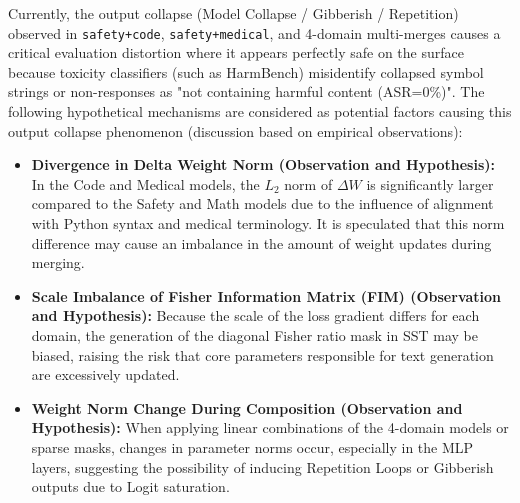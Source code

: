 \documentclass{article}
\begin{document}

Currently, the output collapse (Model Collapse / Gibberish / Repetition) observed in \texttt{safety+code}, \texttt{safety+medical}, and 4-domain multi-merges causes a critical evaluation distortion where it appears perfectly safe on the surface because toxicity classifiers (such as HarmBench) misidentify collapsed symbol strings or non-responses as "not containing harmful content (ASR=0\%)".
The following hypothetical mechanisms are considered as potential factors causing this output collapse phenomenon (discussion based on empirical observations):
\begin{itemize}
    \item \textbf{Divergence in Delta Weight Norm (Observation and Hypothesis):}
    In the Code and Medical models, the $L_2$ norm of $\Delta W$ is significantly larger compared to the Safety and Math models due to the influence of alignment with Python syntax and medical terminology. It is speculated that this norm difference may cause an imbalance in the amount of weight updates during merging.
    \item \textbf{Scale Imbalance of Fisher Information Matrix (FIM) (Observation and Hypothesis):}
    Because the scale of the loss gradient differs for each domain, the generation of the diagonal Fisher ratio mask in SST may be biased, raising the risk that core parameters responsible for text generation are excessively updated.
    \item \textbf{Weight Norm Change During Composition (Observation and Hypothesis):}
    When applying linear combinations of the 4-domain models or sparse masks, changes in parameter norms occur, especially in the MLP layers, suggesting the possibility of inducing Repetition Loops or Gibberish outputs due to Logit saturation.
\end{itemize}
\end{document}

